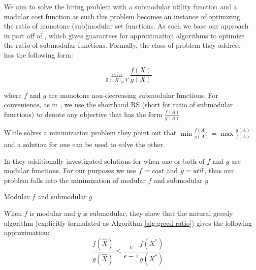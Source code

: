 We aim to solve the hiring problem with a submodular utility function and a modular cost function as such this problem becomes an instance of optimizing the ratio of monotone (sub)modular set functions. As such we base our approach in part off of \cite{bai2016algorithms}, which gives guarantees for approximation algorithms to optimize the ratio of submodular functions.
Formally, the class of problem they address has the following form:

\begin{equation}\label{prob:RS-min}
	\underset{\emptyset \subset X \subseteq V}{\min} \frac{f(X)}{g(X)}
\end{equation}

where $ f $ and $ g $ are monotone non-decreasing submodular functions.
For convenience, as in \cite{bai2016algorithms}, we use the shorthand RS (short for ratio of submodular functions) to denote any objective that has the form $ \frac{f(A)}{g(A)} $.

While \cite{bai2016algorithms} solves a minimization problem they point out that $ \min \frac{f(A)}{g(A)} = \max \frac{g(A)}{f(A)} $ and a solution for one can be used to solve the other. 

In \cite{bai2016algorithms} they additionally investigated solutions for when one or both of $f$ and $g$ are modular functions. For our purposes we use $f=cost$ and $g={util}$, thus our problem falls into the minimization of modular $f$ and submodular $g$ 

\begin{property}
	\label{prop:mod-f-submod-g}
	Modular $ f $ and submodular $ g $
\end{property}

When $ f $ is modular and $ g $ is submodular, they show that the natural greedy algorithm (explicitly formulated as Algorithm \ref{alg:greed-ratio}) gives the following approximation:
\begin{equation}
	\label{eq:greedy-approx}
	\frac{f(\hat{X})}{g(\hat{X})} \leq \frac{e}{e - 1} \frac{f(X^*)}{g(X^*)}
\end{equation}
 

 

